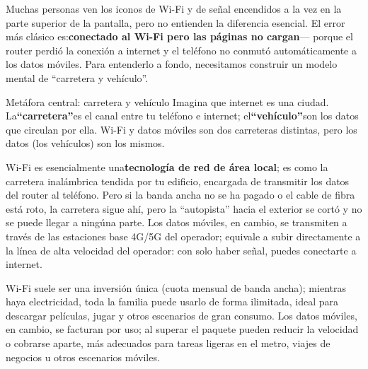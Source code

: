 


Muchas personas ven los iconos de Wi-Fi y de señal encendidos a la vez en la parte superior de la pantalla, pero no entienden la diferencia esencial. El error más clásico es:\textbf{conectado al Wi-Fi pero las páginas no cargan}— porque el router perdió la conexión a internet y el teléfono no conmutó automáticamente a los datos móviles. Para entenderlo a fondo, necesitamos construir un modelo mental de “carretera y vehículo”.

\begin{tcbinfo}{Metáfora central: carretera y vehículo}
Imagina que internet es una ciudad. La\textbf{“carretera”}es el canal entre tu teléfono e internet; el\textbf{“vehículo”}son los datos que circulan por ella. Wi-Fi y datos móviles son dos carreteras distintas, pero los datos (los vehículos) son los mismos.

\end{tcbinfo}


Wi-Fi es esencialmente una\textbf{tecnología de red de área local}; es como la carretera inalámbrica tendida por tu edificio, encargada de transmitir los datos del router al teléfono. Pero si la banda ancha no se ha pagado o el cable de fibra está roto, la carretera sigue ahí, pero la “autopista” hacia el exterior se cortó y no se puede llegar a ningúna parte. Los datos móviles, en cambio, se transmiten a través de las estaciones base 4G/5G del operador; equivale a subir directamente a la línea de alta velocidad del operador: con solo haber señal, puedes conectarte a internet.


Wi-Fi suele ser una inversión única (cuota mensual de banda ancha); mientras haya electricidad, toda la familia puede usarlo de forma ilimitada, ideal para descargar películas, jugar y otros escenarios de gran consumo. Los datos móviles, en cambio, se facturan por uso; al superar el paquete pueden reducir la velocidad o cobrarse aparte, más adecuados para tareas ligeras en el metro, viajes de negocios u otros escenarios móviles.

